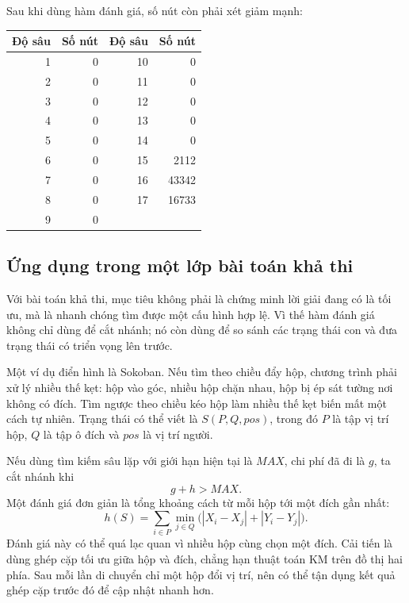 \documentclass[11pt]{article}
\begin{document}
Sau khi dùng hàm đánh giá, số nút còn phải xét giảm mạnh:

\begin{center}
\begin{tabular}{r|r@{\qquad}r|r}
\textbf{Độ sâu} & \textbf{Số nút} & \textbf{Độ sâu} & \textbf{Số nút}\\
\hline
1 & 0 & 10 & 0\\
2 & 0 & 11 & 0\\
3 & 0 & 12 & 0\\
4 & 0 & 13 & 0\\
5 & 0 & 14 & 0\\
6 & 0 & 15 & 2112\\
7 & 0 & 16 & 43342\\
8 & 0 & 17 & 16733\\
9 & 0 & & \\
\end{tabular}
\end{center}

\subsection{Ứng dụng trong một lớp bài toán khả thi}

Với bài toán khả thi, mục tiêu không phải là chứng minh lời giải đang có là
tối ưu, mà là nhanh chóng tìm được một cấu hình hợp lệ. Vì thế hàm đánh giá
không chỉ dùng để cắt nhánh; nó còn dùng để so sánh các trạng thái con và đưa
trạng thái có triển vọng lên trước.

Một ví dụ điển hình là Sokoban. Nếu tìm theo chiều đẩy hộp, chương trình phải
xử lý nhiều thế kẹt: hộp vào góc, nhiều hộp chặn nhau, hộp bị ép sát tường nơi
không có đích. Tìm ngược theo chiều kéo hộp làm nhiều thế kẹt biến mất một
cách tự nhiên. Trạng thái có thể viết là \(S(P,Q,\mathit{pos})\), trong đó
\(P\) là tập vị trí hộp, \(Q\) là tập ô đích và \(\mathit{pos}\) là vị trí
người.

Nếu dùng tìm kiếm sâu lặp với giới hạn hiện tại là \(\mathit{MAX}\), chi phí
đã đi là \(g\), ta cắt nhánh khi
\[
  g+h>\mathit{MAX}.
\]
Một đánh giá đơn giản là tổng khoảng cách từ mỗi hộp tới một đích gần nhất:
\[
  h(S)=\sum_{i\in P}\min_{j\in Q}
  \bigl(|X_i-X_j|+|Y_i-Y_j|\bigr).
\]
Đánh giá này có thể quá lạc quan vì nhiều hộp cùng chọn một đích. Cải tiến là
dùng ghép cặp tối ưu giữa hộp và đích, chẳng hạn thuật toán KM trên đồ thị hai
phía. Sau mỗi lần di chuyển chỉ một hộp đổi vị trí, nên có thể tận dụng kết
quả ghép cặp trước đó để cập nhật nhanh hơn.
\end{document}
